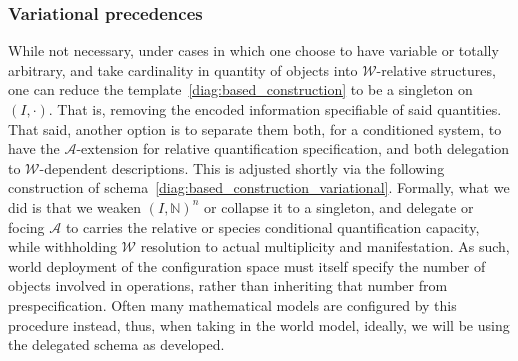 \subsubsection{Variational precedences}

While not necessary, under cases in which one choose to have variable or totally arbitrary, and take cardinality in quantity of objects into $\mathcal{W}$-relative structures, one can reduce the template~\ref{diag:based_construction} to be a singleton on $(I,\cdot)$. That is, removing the encoded information specifiable of said quantities. That said, another option is to separate them both, for a conditioned system, to have the $\mathcal{A}$-extension for relative quantification specification, and both delegation to $\mathcal{W}$-dependent descriptions. This is adjusted shortly via the following construction of schema~\ref{diag:based_construction_variational}. Formally, what we did is that we weaken $(I,\mathbb{N})^{n}$ or collapse it to a singleton, and delegate or focing $\mathcal{A}$ to carries the relative or species conditional quantification capacity, while withholding $\mathcal{W}$ resolution to actual multiplicity and manifestation. As such, world deployment of the configuration space must itself specify the number of objects involved in operations, rather than inheriting that number from prespecification. Often many mathematical models are configured by this procedure instead, thus, when taking in the world model, ideally, we will be using the delegated schema as developed. 

